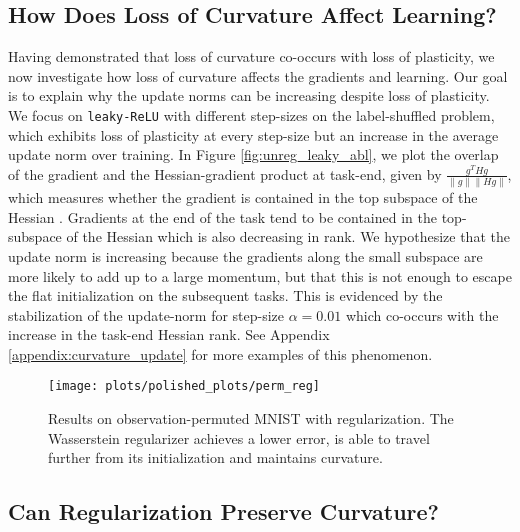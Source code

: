 \documentclass{article}
\begin{document}
\subsection{How Does Loss of Curvature Affect Learning?}
\vspace{-2mm}

Having demonstrated that loss of curvature co-occurs with loss of plasticity, we now investigate how loss of curvature affects the gradients and learning.
Our goal is to explain why the update norms can be increasing despite loss of plasticity.
We focus on \texttt{leaky-ReLU} with different step-sizes on the label-shuffled problem, which exhibits loss of plasticity at every step-size but an increase in the average update norm over training.
In Figure \ref{fig:unreg_leaky_abl}, we plot the overlap of the gradient and the Hessian-gradient product at task-end, given by $\frac{g^{T}Hg}{\|g\|\|Hg\|}$, which measures whether the gradient is contained in the top subspace of the Hessian \citep{gur-ari18_gradien_descen_happen_tiny_subsp}.
Gradients at the end of the task tend to be contained in the top-subspace of the Hessian which is also decreasing in rank.
We hypothesize that the update norm is increasing because the gradients along the small subspace are more likely to add up to a large momentum, but that this is not enough to escape the flat initialization on the subsequent tasks.
This is evidenced by the stabilization of the update-norm for step-size $\alpha = 0.01$ which co-occurs with the increase in the task-end Hessian rank. See Appendix \ref{appendix:curvature_update} for more examples of this phenomenon.


\begin{figure}[h!]
  \centering
  \texttt{[image: plots/polished\_plots/perm\_reg]}
\caption{Results on observation-permuted MNIST with regularization. The Wasserstein regularizer achieves a lower error, is able to travel further from its initialization and maintains curvature.}
  \label{fig:perm_mnist_sgd_reg}
\end{figure}
\subsection{Can Regularization Preserve Curvature?}
\vspace{-2mm}
\end{document}
